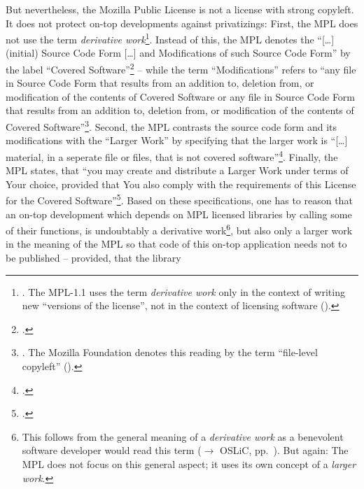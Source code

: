 But nevertheless, the Mozilla Public License is not a license with strong
copyleft. It does not protect on-top developments against privatizings: First,
the MPL does not use the term \emph{derivative work}\footnote{
\cite[cf.][\nopage wp]{Mpl20OsiLicense2013a}. The MPL-1.1 uses the term
\emph{derivative work} only in the context of writing new \enquote{versions of
the license}, not in the context of licensing software (\cite[cf.][\nopage wp. 
§6.3]{Mpl11MozFoundation2013a}).}. Instead of this, the MPL denotes the
\enquote{[\ldots] (initial) Source Code Form [\ldots] and Modifications of such
Source Code Form} by the label \enquote{Covered Software}\footcite[cf.][\nopage
wp.\ §1.4]{Mpl20OsiLicense2013a} -- while the term \enquote{Modifications}
refers to \enquote{any file in Source Code Form that results from an addition
to, deletion from, or modification of the contents of Covered Software or any
file in Source Code Form that results from an addition to, deletion from, or
modification of the contents of Covered Software}\footnote{\cite[cf.][\nopage
wp.\ §1.10]{Mpl20OsiLicense2013a}. The Mozilla Foundation denotes this reading
by the term \enquote{file-level copyleft} (\cite[cf.][\nopage
wp]{Mpl11To20MozFoundation2013a}).}. Second, the MPL contrasts the source code
form and its modifications with the \enquote{Larger Work} by specifying that the
larger work is \enquote{[\ldots] material, in a seperate file or files, that is
not covered software}\footcite[cf.][\nopage wp.\ §1.7]{Mpl20OsiLicense2013a}.
Finally, the MPL states, that \enquote{you may create and distribute a Larger
Work under terms of Your choice, provided that You also comply with the
requirements of this License for the Covered Software}\footcite[cf.][\nopage
wp.\ §3.3]{Mpl20OsiLicense2013a}. Based on these specifications, one has to
reason that an on-top development which depends on MPL licensed libraries by
calling some of their functions, is undoubtably a derivative work\footnote{This
follows from the general meaning of a \emph{derivative work} as a benevolent
software developer would read this term ($\rightarrow$ OSLiC, pp.\
\pageref{sec:BenevolentDerivativeWorkUnderstanding}). But again: The MPL does
not focus on this general aspect; it uses its own concept of a \emph{larger
work}.}, but also only a larger work in the meaning of the MPL so that code of
this on-top application needs not to be published -- provided, that the library
